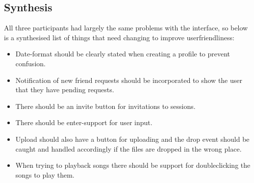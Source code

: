 \subsection{Synthesis}
All three participants had largely the same problems with the interface, so below is a synthesised list of things that need changing to improve userfriendliness:
\begin{itemize}
	\item Date-format should be clearly stated when creating a profile to prevent confusion.
	\item Notification of new friend requests should be incorporated to show the user that they have pending requests.
	\item There should be an invite button for invitations to sessions.
	\item There should be enter-support for user input. 
	\item Upload should also have a button for uploading and the drop event should be caught and handled accordingly if the files are dropped in the wrong place.
	\item When trying to playback songs there should be support for doubleclicking the songs to play them.
\end{itemize}